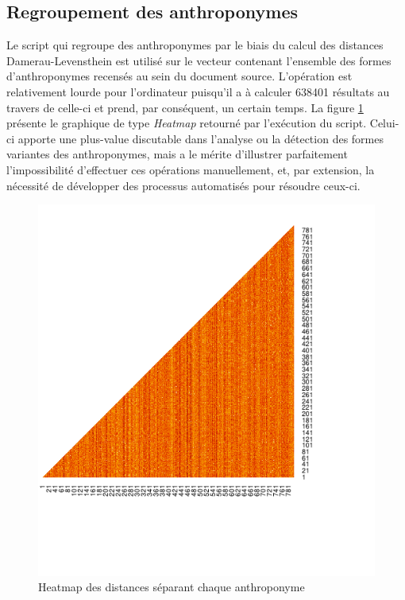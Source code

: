 \subsection{Regroupement des anthroponymes}
Le script qui regroupe des anthroponymes par le biais du calcul des distances Damerau-Levensthein est utilisé sur le vecteur contenant l'ensemble des formes d'anthroponymes recensés au sein du document source. L'opération est relativement lourde pour l'ordinateur puisqu'il a à calculer 638401 résultats au travers de celle-ci et prend, par conséquent, un certain temps. La figure \ref{heatmap_anthro} présente le graphique de type \textit{Heatmap} retourné par l'exécution du script. Celui-ci apporte une plus-value discutable dans l'analyse ou la détection des formes variantes des anthroponymes, mais a le mérite d'illustrer parfaitement l'impossibilité d'effectuer ces opérations manuellement, et, par extension, la nécessité de développer des processus automatisés pour résoudre ceux-ci.
\begin{figure}
    \centering
    \includegraphics [scale=2]{3.Results/Img/heatmap.pdf}
    \caption{Heatmap des distances séparant chaque anthroponyme}
    \label{heatmap_anthro}
\end{figure}

